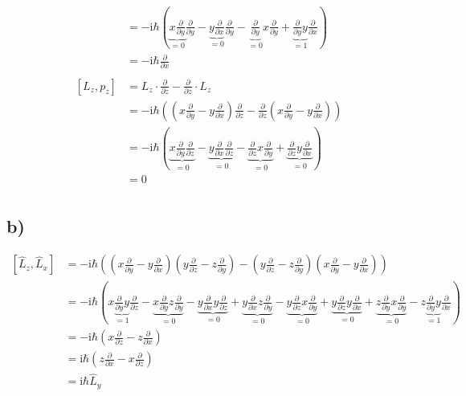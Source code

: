 \begin{align*}
        &= -\text{i}\hbar \left( \underbrace{x\frac{\partial}{\partial y}}_{=0} \frac{\partial}{\partial y} - \underbrace{y\frac{\partial}{\partial x}}_{=0} \frac{\partial}{\partial y} - \underbrace{\frac{\partial}{\partial y}}_{=0} x\frac{\partial}{\partial y} + \underbrace{\frac{\partial}{\partial y} y}_{=1}\frac{\partial}{\partial x} \right)\\
        &= -\text{i}\hbar \frac{\partial}{\partial x}\\
        \\
        \left[ L_z,p_z \right] &= L_z\cdot \frac{\partial}{\partial z} - \frac{\partial}{\partial z} \cdot L_z\\
        &= -\text{i}\hbar \left( \left( x\frac{\partial}{\partial y} - y\frac{\partial}{\partial x} \right) \frac{\partial}{\partial z} - \frac{\partial}{\partial z} \left( x\frac{\partial}{\partial y} - y\frac{\partial}{\partial x} \right) \right)\\
        &= -\text{i}\hbar \left( \underbrace{x\frac{\partial}{\partial y} \frac{\partial}{\partial z}}_{=0} - \underbrace{y\frac{\partial}{\partial x} \frac{\partial}{\partial z}}_{=0} - \underbrace{\frac{\partial}{\partial z}x\frac{\partial}{\partial y}}_{=0} + \underbrace{\frac{\partial}{\partial z}y\frac{\partial}{\partial x}}_{=0} \right)\\
        &= 0\\
    \end{align*}

    \subsection{b)} 

    \begin{align*}
        \left[ \hat{L}_z,\hat{L}_x \right] &= -\text{i}\hbar \left(\left( x\frac{\partial}{\partial y} - y\frac{\partial}{\partial x} \right) \left( y\frac{\partial}{\partial z} - z\frac{\partial}{\partial y} \right) - \left( y\frac{\partial}{\partial z} - z\frac{\partial}{\partial y} \right) \left( x\frac{\partial}{\partial y} - y\frac{\partial}{\partial x} \right)\right)\\
        &= -\text{i}\hbar \left( x \underbrace{\frac{\partial}{\partial y}y}_{=1} \frac{\partial}{\partial z} - \underbrace{x\frac{\partial}{\partial y} z\frac{\partial}{\partial y}}_{=0} - \underbrace{y\frac{\partial}{\partial x} y\frac{\partial}{\partial z}}_{=0} + \underbrace{y\frac{\partial}{\partial x} z\frac{\partial}{\partial y}}_{=0} 
        - \underbrace{y\frac{\partial}{\partial z} x\frac{\partial}{\partial y}}_{=0} + \underbrace{y\frac{\partial}{\partial z} y\frac{\partial}{\partial x}}_{=0} + \underbrace{z\frac{\partial}{\partial y} x\frac{\partial}{\partial y}}_{=0} - z \underbrace{\frac{\partial}{\partial y}y}_{=1} \frac{\partial}{\partial x}\right)\\
        &= -\text{i} \hbar\left(x\frac{\partial}{\partial z}-z\frac{\partial}{\partial x}\right)\\
        &= \text{i} \hbar \left(z\frac{\partial}{\partial x}-x\frac{\partial}{\partial z}\right)\\
        &= \text{i}\hbar \hat{L}_y
    \end{align*}

